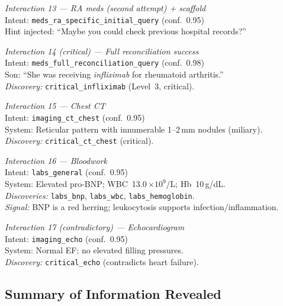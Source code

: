 \smallskip
\textit{Interaction 13 --- RA meds (second attempt) + scaffold} \\
Intent: \texttt{meds\_ra\_specific\_initial\_query} (conf.~0.95) \\
Hint injected: ``Maybe you could check previous hospital records?''

\smallskip
\textit{Interaction 14 (critical) --- Full reconciliation success} \\
Intent: \texttt{meds\_full\_reconciliation\_query} (conf.~0.98) \\
Son: ``She was receiving \emph{infliximab} for rheumatoid arthritis.'' \\
\emph{Discovery:} \texttt{critical\_infliximab} (Level~3, critical).

\smallskip
\textit{Interaction 15 --- Chest CT} \\
Intent: \texttt{imaging\_ct\_chest} (conf.~0.95) \\
System: Reticular pattern with innumerable 1--2\,mm nodules (miliary). \\
\emph{Discovery:} \texttt{critical\_ct\_chest} (critical).

\smallskip
\textit{Interaction 16 --- Bloodwork} \\
Intent: \texttt{labs\_general} (conf.~0.95) \\
System: Elevated pro-BNP; WBC~13.0\,$\times 10^9$/L; Hb~10\,g/dL. \\
\emph{Discoveries:} \texttt{labs\_bnp}, \texttt{labs\_wbc}, \texttt{labs\_hemoglobin}. \\
\emph{Signal:} BNP is a red herring; leukocytosis supports infection/inflammation.

\smallskip
\textit{Interaction 17 (contradictory) --- Echocardiogram} \\
Intent: \texttt{imaging\_echo} (conf.~0.95) \\
System: Normal EF; no elevated filling pressures. \\
\emph{Discovery:} \texttt{critical\_echo} (contradicts heart failure).

\subsection{Summary of Information Revealed}

